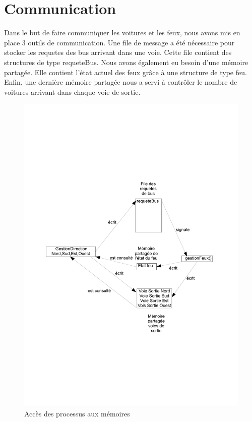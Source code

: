 \section{Communication}
Dans le but de faire communiquer les voitures et les feux, nous avons mis en place 3 outils de communication. Une file de message a été nécessaire pour stocker les requetes des bus arrivant dans une voie. Cette file contient des structures de type requeteBus. Nous avons également eu besoin d'une mémoire partagée. Elle contient l'état actuel des feux grâce à une structure de type feu. Enfin, une dernière mémoire partagée nous a servi à contrôler le nombre de voitures arrivant dans chaque voie de sortie.

\begin{figure}[htb!]
\centering
\includegraphics[scale=0.5]{graphe1LO41.pdf}

\caption{Accès des processus aux mémoires}
\end{figure}
